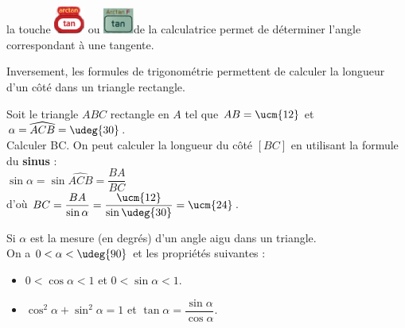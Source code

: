 \begin{remarque}
   la touche \includegraphics[width=1cm]{Geometrie/Images/G10_cours_arctan} ou \includegraphics[width=1cm]{Geometrie/Images/G10_cours_tan}de la calculatrice permet de déterminer l'angle correspondant à une tangente.
\end{remarque}

\medskip

Inversement, les formules de trigonométrie permettent de calculer la longueur d'un côté dans un triangle rectangle.

\begin{exemple}
   Soit le triangle $ABC$ rectangle en $A$ tel que $AB =\ucm{12}$ et $\alpha =\widehat{ACB} =\udeg{30}$. \\
   Calculer BC.
   \correction
      On peut calculer la longueur du côté $[BC]$ en utilisant la formule du \textbf{sinus} : \\ [1mm]
      $\sin\alpha =\sin \widehat{ACB} =\dfrac{BA}{BC}$ \\ [1mm]
      d'où $BC =\dfrac{BA}{\sin \alpha} =\dfrac{\ucm{12}}{\sin\udeg{30}} =\ucm{24}$.
\end{exemple}

\begin{propriete}[Trigonométrie]
   Si $\alpha$ est la mesure (en degrés) d'un angle aigu dans un triangle. \\
   On a $0<\alpha<\udeg{90}$ et les propriétés suivantes :
   \begin{itemize}
      \item $0<\cos \alpha<1$ \quad et \quad $0<\sin \alpha<1.$
      \item $\cos^2\alpha+\sin^2\alpha=1$ \quad et \quad $\tan \alpha=\dfrac{\sin \alpha}{\cos \alpha}.$
   \end{itemize}
\end{propriete}


\activites



